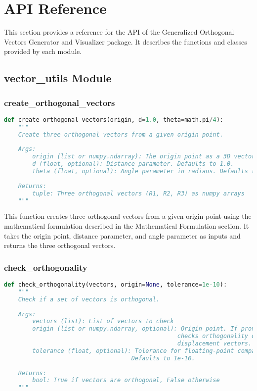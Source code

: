 \section{API Reference}

This section provides a reference for the API of the Generalized Orthogonal Vectors Generator and Visualizer package. It describes the functions and classes provided by each module.

\subsection{vector\_utils Module}

\subsubsection{create\_orthogonal\_vectors}

\begin{lstlisting}[language=Python]
def create_orthogonal_vectors(origin, d=1.0, theta=math.pi/4):
    """
    Create three orthogonal vectors from a given origin point.
    
    Args:
        origin (list or numpy.ndarray): The origin point as a 3D vector [x, y, z]
        d (float, optional): Distance parameter. Defaults to 1.0.
        theta (float, optional): Angle parameter in radians. Defaults to pi/4.
        
    Returns:
        tuple: Three orthogonal vectors (R1, R2, R3) as numpy arrays
    """
\end{lstlisting}

This function creates three orthogonal vectors from a given origin point using the mathematical formulation described in the Mathematical Formulation section. It takes the origin point, distance parameter, and angle parameter as inputs and returns the three orthogonal vectors.

\subsubsection{check\_orthogonality}

\begin{lstlisting}[language=Python]
def check_orthogonality(vectors, origin=None, tolerance=1e-10):
    """
    Check if a set of vectors is orthogonal.
    
    Args:
        vectors (list): List of vectors to check
        origin (list or numpy.ndarray, optional): Origin point. If provided, 
                                                 checks orthogonality of 
                                                 displacement vectors.
        tolerance (float, optional): Tolerance for floating-point comparison. 
                                    Defaults to 1e-10.
        
    Returns:
        bool: True if vectors are orthogonal, False otherwise
    """
\end{lstlisting}

